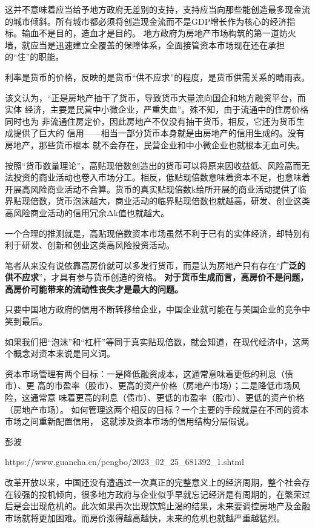 这并不意味着应当给予地方政府无差别的支持，支持应当向那些能创造最多现金流的城市倾斜。所有城市都必须将创造现金流而不是GDP增长作为核心的经济指标。输血不是目的，造血才是目的。
地方政府为房地产市场构筑的第一道防火墙，就应当是迅速建立全覆盖的保障体系，全面接管资本市场现在还在承担的“住”的职能。

利率是货币的价格，反映的是货币“供不应求”的程度，是货币供需关系的晴雨表。

该文认为，“正是房地产抽干了货币，导致货币大量流向国企和地方融资平台，而实体
经济，主要是民营中小微企业，严重失血”。殊不知，由于流通中的住房价格同时也为
非流通住房定价，因此房地产不仅没有抽干货币，相反，它还为货币生成提供了巨大的
信用——相当一部分货币本身就是由房地产的信用生成的。没有房地产，那些货币根本
就不会存在，民营企业和中小微企业也就根本无血可失。

按照“货币数量理论”，高贴现倍数创造出的货币可以将原来因收益低、风险高而无法投资的商业活动也卷入市场分工。相反，低贴现倍数意味着资本不足，也意味着开展高风险商业活动不合算。货币的真实贴现倍数k给所开展的商业活动提供了临界贴现倍数，货币泡沫越大，商业活动的临界贴现倍数也就越高，研发、创业这类高风险商业活动的信用冗余Δk值也就越大。

一个合理的推测就是，高贴现倍数资本市场虽然不利于已有的实体经济，却特别有利于研发、创新和创业这类高风险投资活动。

笔者从来没有说依靠高房价就可以多发行货币，而是认为房地产只有存在“\textbf{广泛的供不应求}”，才具有参与货币创造的资格。
\textbf{对于货币生成而言，高房价不是问题，高房价可能带来的流动性丧失才是最大的问题。}

只要中国地方政府的信用不断转移给企业，中国企业就可能在与美国企业的竞争中笑到最后。

如果我们把“泡沫”和“杠杆”等同于真实贴现倍数，就会知道，在现代经济中，这两个概念对资本来说是同义词。

资本市场管理有两个目标：一是降低融资成本，这通常意味着更低的利息（债市）、更
高的市盈率（股市）、更高的资产价格（房地产市场）；二是降低市场风险，这通常意
味着更高的利息（债市）、更低的市盈率（股市）、更低的资产价格（房地产市场）。
如何管理这两个相反的目标？一个主要的手段就是在不同的资本市场之间重新配置信用，
这就涉及资本市场的信用结构分层假说。







彭波

https://www.guancha.cn/pengbo/2023_02_25_681392_1.shtml

改革开放以来，中国还没有遭遇过一次真正的完整意义上的经济周期，整个社会存在较强的投机倾向，很多地方政府与企业似乎早就忘记经济是有周期的，在繁荣过后是会出现危机的。此次如果再次出现饮鸩止渴的结果，未来要调控房地产及金融市场就将更加困难。而房价涨得越高越快，未来的危机也就越严重越猛烈。

